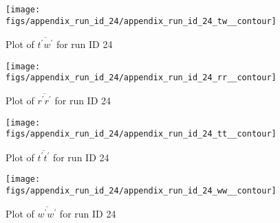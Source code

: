\begin{figure}[H]
\centering
\texttt{[image: figs/appendix\_run\_id\_24/appendix\_run\_id\_24\_tw\_\_contour]}
\caption{Plot of $\overline{t^\prime w^\prime}$ for run ID 24}
\label{fig:appendix_run_id_24_tw__contour}
\end{figure}


\begin{figure}[H]
\centering
\texttt{[image: figs/appendix\_run\_id\_24/appendix\_run\_id\_24\_rr\_\_contour]}
\caption{Plot of $\overline{r^\prime r^\prime}$ for run ID 24}
\label{fig:appendix_run_id_24_rr__contour}
\end{figure}


\begin{figure}[H]
\centering
\texttt{[image: figs/appendix\_run\_id\_24/appendix\_run\_id\_24\_tt\_\_contour]}
\caption{Plot of $\overline{t^\prime t^\prime}$ for run ID 24}
\label{fig:appendix_run_id_24_tt__contour}
\end{figure}


\begin{figure}[H]
\centering
\texttt{[image: figs/appendix\_run\_id\_24/appendix\_run\_id\_24\_ww\_\_contour]}
\caption{Plot of $\overline{w^\prime w^\prime}$ for run ID 24}
\label{fig:appendix_run_id_24_ww__contour}
\end{figure}


